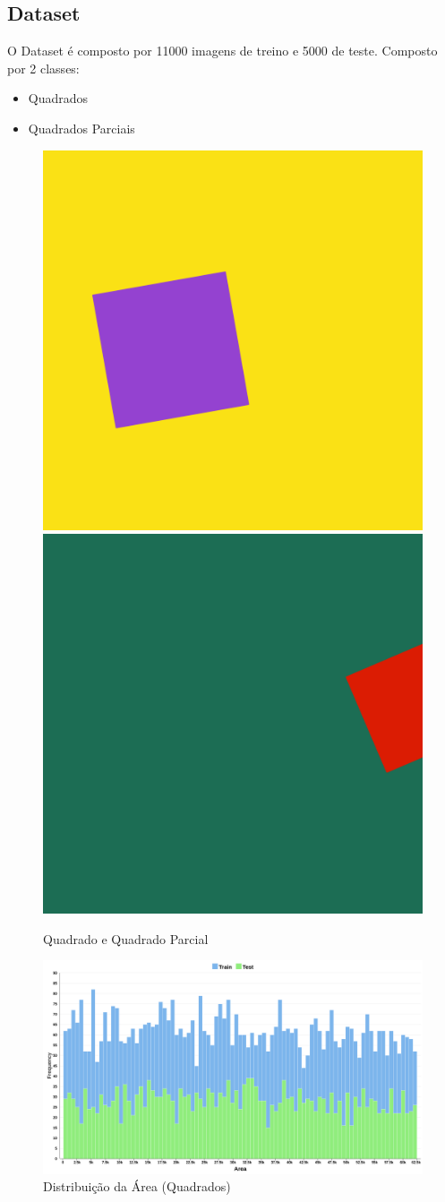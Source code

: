 \subsection{Dataset}
O Dataset é composto por 11000 imagens de treino e 5000 de teste. Composto por 2 classes: 
\begin{itemize}
    \item Quadrados 
    \item Quadrados Parciais

\end{itemize}
\begin{figure}[H]
    \centering
    \includegraphics[width=0.35\linewidth]{imgs/Test_5/dataset_5/square_5501.png}
    \includegraphics[width=0.35\linewidth]{imgs/Test_5/dataset_5/square_cut_5501.png}
    \caption{Quadrado e Quadrado Parcial}
    \label{fig:enter-label}
\end{figure}
\begin{figure}[H]
    \centering
    \includegraphics[width=1.0\linewidth]{imgs/Test_5/dataset_5/Squares_Area_Distribution_Hist.png}
    \caption{Distribuição da Área (Quadrados)}
    \label{fig:enter-label}
\end{figure}
